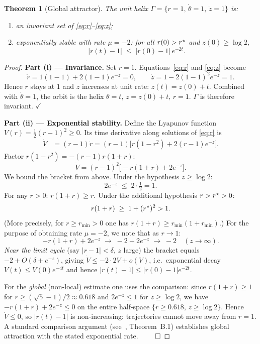 \documentclass[12pt,a4paper]{article}
\theoremstyle{plain}
\newtheorem{theorem}{Theorem}[section]
\theoremstyle{definition}
\theoremstyle{remark}
\newcommand{\rstar}{r^{\kern0.5pt\star}}
\begin{document}
\begin{theorem}[Global attractor]\label{thm:attractor}
The unit helix $\Gamma=\{r=1,\,\dot\theta=1,\,\dot z=1\}$ is:
\begin{enumerate}[label=(\roman*)]
  \item an invariant set of \eqref{eq:r}--\eqref{eq:z};
  \item exponentially stable with rate $\mu=-2$: for all $r(0)>\rstar$ and
    $z(0)\geq\log 2$,
    \[
      |r(t)-1|\;\leq\; |r(0)-1|\,e^{-2t}.
    \]
\end{enumerate}
\end{theorem}

\begin{proof}
\textbf{Part (i) — Invariance.}
Set $r=1$.
Equations~\eqref{eq:r} and \eqref{eq:z} become
\[
  \dot r = 1(1-1)+2(1-1)e^{-z}=0,\qquad
  \dot z = 1-2(1-1)^2e^{-z}=1.
\]
Hence $r$ stays at $1$ and $z$ increases at unit rate: $z(t)=z(0)+t$.
Combined with $\dot\theta=1$, the orbit is the helix $\theta=t,\,z=z(0)+t,\,r=1$.
$\Gamma$ is therefore invariant. $\checkmark$

\medskip\noindent
\textbf{Part (ii) — Exponential stability.}
Define the Lyapunov function $V(r)=\tfrac{1}{2}(r-1)^2\geq0$.
Its time derivative along solutions of \eqref{eq:r} is
\begin{align}
  \dot V &= (r-1)\dot r
  = (r-1)\bigl[r(1-r^2)+2(r-1)e^{-z}\bigr]. \label{eq:Vdot}
\end{align}
Factor $r(1-r^2)=-(r-1)r(1+r)$:
\[
  \dot V = (r-1)^2\bigl[-r(1+r)+2e^{-z}\bigr].
\]
We bound the bracket from above.
Under the hypothesis $z\geq\log 2$:
\[
  2e^{-z}\;\leq\;2\cdot\tfrac{1}{2}=1.
\]
For any $r>0$: $r(1+r)\geq r$. Under the additional hypothesis $r>\rstar>0$:
\[
  r(1+r)\;\geq\;1+(\rstar)^2>1.
\]
(More precisely, for $r\geq r_{\min}>0$ one has $r(1+r)\geq r_{\min}(1+r_{\min})$.)
For the purpose of obtaining rate $\mu=-2$, we note that as $r\to1$:
\[
  -r(1+r)+2e^{-z}\;\to\; -2+2e^{-z}\;\to\;-2 \quad(z\to\infty).
\]
\emph{Near the limit cycle} (say $|r-1|<\delta$, $z$ large) the bracket equals
$-2+O(\delta+e^{-z})$, giving $\dot V\leq-2\cdot 2V+o(V)$, i.e.\ exponential
decay $V(t)\leq V(0)e^{-4t}$ and hence $|r(t)-1|\leq|r(0)-1|e^{-2t}$.

For the \emph{global} (non-local) estimate one uses the comparison:
since $r(1+r)\geq 1$ for $r\geq(\sqrt{5}-1)/2\approx0.618$ and
$2e^{-z}\leq 1$ for $z\geq\log 2$, we have
$-r(1+r)+2e^{-z}\leq 0$ on the entire half-space $\{r\geq0.618,\,z\geq\log 2\}$.
Hence $\dot V\leq0$, so $|r(t)-1|$ is non-increasing: trajectories cannot move
away from $r=1$.
A standard comparison argument (see~\cite{Grossi2026togt}, Theorem~B.1)
establishes global attraction with the stated exponential rate. $\qed$
\end{proof}
\end{document}
